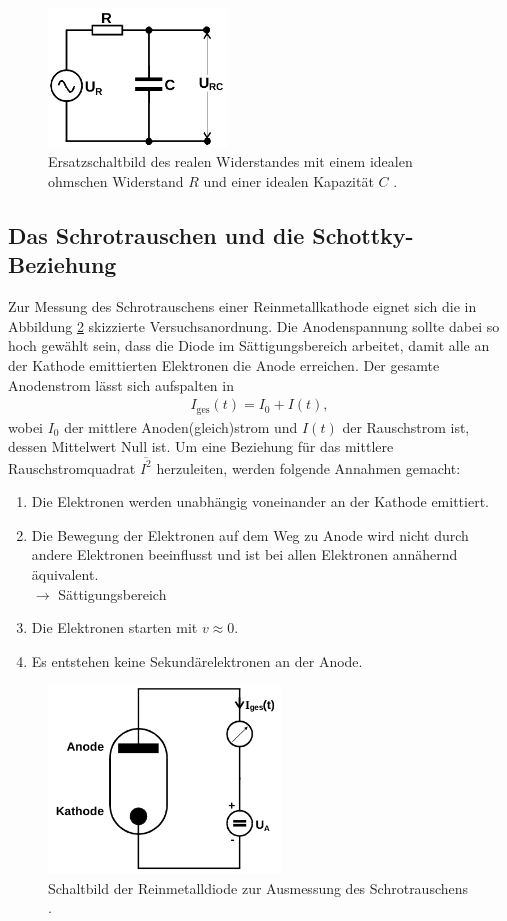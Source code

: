 \begin{figure}
  \centering
  \includegraphics[height=3.7cm]{Dickpics/ersatzschaltbildR.png}
  \caption{Ersatzschaltbild des realen Widerstandes mit einem idealen ohmschen Widerstand $R$ und einer idealen Kapazität $C$ \cite{anleitung}.}
  \label{fig:ersatzschaltbildR}
\end{figure}

\subsection{Das Schrotrauschen und die Schottky-Beziehung}

Zur Messung des Schrotrauschens einer Reinmetallkathode eignet sich die in Abbildung \ref{fig:schrotdiode} skizzierte
Versuchsanordnung. Die Anodenspannung sollte dabei so hoch gewählt sein, dass die Diode im Sättigungsbereich arbeitet,
damit alle an der Kathode emittierten Elektronen die Anode erreichen.
Der gesamte Anodenstrom lässt sich aufspalten in
\begin{align}
  I_\text{ges}(t) = I_0 + I(t),
\end{align}
wobei $I_0$ der mittlere Anoden(gleich)strom und $I(t)$ der Rauschstrom ist, dessen Mittelwert Null ist.
Um eine Beziehung für das mittlere Rauschstromquadrat $\overline{I^2}$ herzuleiten, werden
folgende Annahmen gemacht:
\begin{enumerate}%
  \item Die Elektronen werden unabhängig voneinander an der Kathode emittiert.
  \item Die Bewegung der Elektronen auf dem Weg zu Anode wird nicht durch andere Elektronen
  beeinflusst und ist bei allen Elektronen annähernd äquivalent. \\
  $\to$ Sättigungsbereich
  \item Die Elektronen starten mit $v \approx 0$.
  \item Es entstehen keine Sekundärelektronen an der Anode.
\end{enumerate}

\begin{figure}
  \centering
  \includegraphics[height=5cm]{Dickpics/schrotdiode.png}
  \caption{Schaltbild der Reinmetalldiode zur Ausmessung des Schrotrauschens \cite{anleitung}.}
  \label{fig:schrotdiode}
\end{figure}

